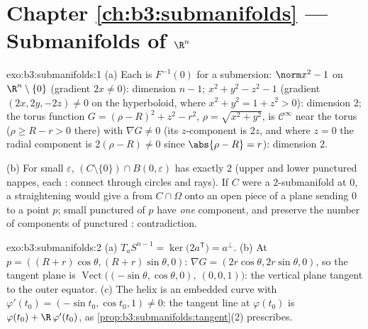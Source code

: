 \section*{Chapter \ref{ch:b3:submanifolds} --- Submanifolds of
$\R^n$}

\begin{solution}{exo:b3:submanifolds:1}
(a) Each is $F^{-1}(0)$ for a submersion: $\norm x^2 - 1$ on
$\R^n\setminus\{0\}$ (gradient $2x \neq 0$): dimension $n-1$;
$x^2 + y^2 - z^2 - 1$ (gradient $(2x, 2y, -2z) \neq 0$ on the
hyperboloid, where $x^2 + y^2 = 1 + z^2 > 0$): dimension $2$;
the torus function $G = (\rho - R)^2 + z^2 - r^2$, $\rho =
\sqrt{x^2+y^2}$, is $\mathcal C^\infty$ near the torus ($\rho
\geq R - r > 0$ there) with $\nabla G \neq 0$ (its
$z$-component is $2z$, and where $z = 0$ the radial component
is $2(\rho - R)\ne0$ since $\abs{\rho - R} = r$): dimension
$2$.

(b) For small $\varepsilon$,
$(C\setminus\{0\})\cap B(0,\varepsilon)$ has exactly $2$
 (upper and lower punctured nappes, each
: connect through circles and rays). If $C$
were a $2$-submanifold at $0$, a straightening would give a
 from $C\cap\Omega$ onto an open piece of a
plane sending $0$ to a point $p$; small punctured
 of $p$ have \emph{one} component, and
 preserve the number of components of punctured
: contradiction.
\end{solution}

\begin{solution}{exo:b3:submanifolds:2}
(a) $T_aS^{n-1} = \ker\bigl(2a^{\mathsf T}\bigr) = a^\perp$.
(b) At $p = ((R+r)\cos\theta, (R+r)\sin\theta, 0)$: $\nabla G
= (2r\cos\theta, 2r\sin\theta, 0)$, so the tangent plane is
$\operatorname{Vect}\bigl((-\sin\theta, \cos\theta, 0),\ (0,
0, 1)\bigr)$: the vertical plane tangent to the outer
equator.
(c) The helix is an embedded curve with $\varphi'(t_0) =
(-\sin t_0, \cos t_0, 1) \neq 0$: the tangent line at
$\varphi(t_0)$ is $\varphi(t_0) + \R\,\varphi'(t_0)$, as
\cref{prop:b3:submanifolds:tangent}(2) prescribes.
\end{solution}

